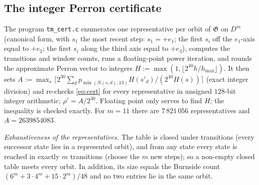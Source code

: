 \documentclass[11pt,a4paper]{article}
\theoremstyle{plain}
\theoremstyle{remark}
\numberwithin{equation}{section}
\begin{document}
\subsection{The integer Perron certificate}\label{sec:perron}
The program \texttt{tm\_cert.c} enumerates one representative per orbit of $\mathfrak G$ on $D^m$ (canonical form, with $s_1$ the most recent step: $s_1=+e_1$;
the first $s_i$ off the $e_1$-axis equal to $+e_2$; the first $s_i$ along the third axis equal to $+e_3$), computes the transitions and window
counts, runs a floating-point power iteration, and rounds the approximate Perron vector to integers $H:=\max(1,\lfloor2^{40}h/
h_{\max}\rfloor)$. It then sets $A:=\max_s\lceil2^{30}\sum_dp_{\min(N(s,d),13)}H(s'_d)/(2^{40}H(s))\rceil$ (exact integer division) and
re-checks \eqref{eq:cert} for every representative in unsigned $128$-bit integer arithmetic; $\rho'=A/2^{30}$. Floating point only
serves to find $H$; the inequality is checked exactly. For $m=11$ there are $7\,821\,056$ representatives and $A=2639854083$.

\emph{Exhaustiveness of the representatives.} The table is closed under transitions (every successor state lies in a represented
orbit), and from any state every state is reached in exactly $m$ transitions (choose the $m$ new steps); so a non-empty closed table
meets every orbit. In addition, its size equals the Burnside count $(6^m+3\cdot4^m+15\cdot2^m)/48$ and no two entries lie in the same
orbit.
\end{document}
